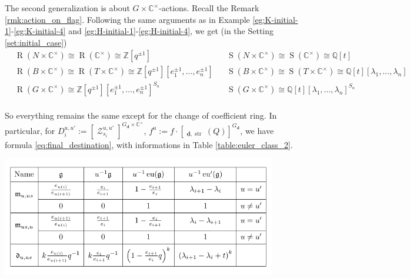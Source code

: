 \documentclass[reqno,11pt]{book}
\numberwithin{equation}{section}
\theoremstyle{plain}
\theoremstyle{plain}
\numberwithin{equation}{section}
\theoremstyle{remark}
\DeclareMathOperator{\RRep}{\widetilde{\operatorname{Rep}}}
\DeclareMathOperator{\Rpt}{\operatorname{R}}
\DeclareMathOperator{\Spt}{\operatorname{S}}
\DeclareMathOperator{\St}{\mathcal{Z}}
\DeclareMathOperator{\str}{\operatorname{str}}
\newcommand{\dimvec}[1]{\mathbf{#1}}
\newcommand{\ftdimvec}[1]{\underline{\dimvec{#1}}}
\begin{document}
The second generalization is about $G \times \mathbb{C}^{\times}$-actions. Recall the Remark \ref{rmk:action_on_flag}. Following the same arguments as in Example \ref{eg:K-initial-1}-\ref{eg:K-initial-4} and \ref{eg:H-initial-1}-\ref{eg:H-initial-4}, we get (in the Setting \ref{set:initial_case})
\begin{equation*}
\begin{aligned}
 &\Rpt(N \times \mathbb{C}^{\times}) \cong \Rpt(\mathbb{C}^{\times}) \cong \mathbb{Z}[q^{\pm 1 }]&&\Spt(N \times \mathbb{C}^{\times}) \cong \Spt(\mathbb{C}^{\times}) \cong \mathbb{Q}[t] \\
 &\Rpt(B \times \mathbb{C}^{\times}) \cong \Rpt(T \times \mathbb{C}^{\times}) \cong \mathbb{Z}[q^{\pm 1 }]\!\left[ e_1^{\pm 1},\ldots,e_n^{\pm 1} \right]&&\Spt(B \times \mathbb{C}^{\times}) \cong \Spt(T \times \mathbb{C}^{\times}) \cong \mathbb{Q}[t]\!\left[ \lambda_1,\ldots,\lambda_n \right]\\
 &\Rpt(G \times \mathbb{C}^{\times})  \cong \mathbb{Z}[q^{\pm 1}]\!\left[ e_1^{\pm 1},\ldots,e_n^{\pm 1} \right]^{S_n}&&\Spt(G \times \mathbb{C}^{\times}) \cong \mathbb{Q}[t]\!\left[ \lambda_1,\ldots,\lambda_n \right]^{S_n}\\ 
\end{aligned}
\end{equation*}

So everything remains the same except for the change of coefficient ring. In particular, for $D_i^{u,u'}:=[\St_{s_{i}}^{u,u'}]^{G_{\dimvec{d}} \times \mathbb{C}^{\times}}$, $f^{u}:=f \cdot \left[\RRep_{\ftdimvec{d},\str}(Q) \right]^{G_{\dimvec{d}}}$, we have formula \eqref{eq:final_destination}, with informations in Table \ref{table:euler_class_2}.

\begin{table}[ht]
  \vspace{0cm}
    \centering  \includegraphics[width=12cm]{figures/table/table_euler_class_q.pdf}
      \caption{}
      \label{table:euler_class_2}        
\end{table}
\end{document}
